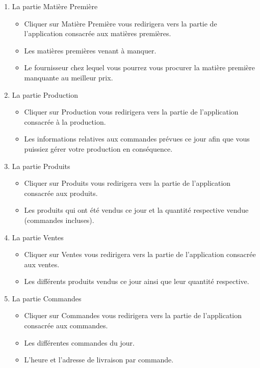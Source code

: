 \begin{enumerate}
    \item La partie Matière Première
    \begin{itemize}
        \item Cliquer sur Matière Première vous redirigera vers la partie de
            l'application consacrée aux matières premières.
        \item Les matières premières venant à manquer.
        \item Le fournisseur chez lequel vous pourrez vous procurer la matière
            première manquante au meilleur prix.
    \end{itemize}
    \item La partie Production
    \begin{itemize}
        \item Cliquer sur Production vous redirigera vers la partie de
            l'application consacrée à la production.
        \item Les informations relatives aux commandes prévues ce jour afin que
            vous puissiez gérer votre production en conséquence.
    \end{itemize}
    \item La partie Produits
    \begin{itemize}
        \item Cliquer sur Produits vous redirigera vers la partie de
            l'application consacrée aux produits.
        \item Les produits qui ont été vendus ce jour et la quantité respective
            vendue (commandes incluses).
    \end{itemize}
    \item La partie Ventes
    \begin{itemize}
        \item Cliquer sur Ventes vous redirigera vers la partie de
            l'application consacrée aux ventes.
        \item Les différents produits vendus ce jour ainsi que leur quantité
            respective.
    \end{itemize}
    \item La partie Commandes
    \begin{itemize}
        \item Cliquer sur Commandes vous redirigera vers la partie de
            l'application consacrée aux commandes.
        \item Les différentes commandes du jour.
        \item L'heure et l'adresse de livraison par commande.
    \end{itemize}
\end{enumerate}


